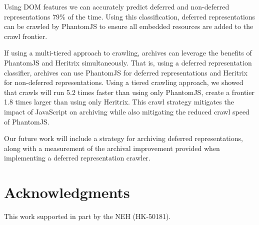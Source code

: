 \documentclass{sig-alternate}
\begin{document}
Using DOM features we can accurately predict deferred and non-deferred representations 79\% of the time. Using this classification, deferred representations can be crawled by PhantomJS to ensure all embedded resources are added to the crawl frontier.

If using a multi-tiered approach to crawling, archives can leverage the benefits of PhantomJS and Heritrix simultaneously. That is, using a deferred representation classifier, archives can use PhantomJS for deferred representations and Heritrix for non-deferred representations. Using a tiered crawling approach, we showed that crawls will run 5.2 times faster than using only PhantomJS, create a frontier 1.8 times larger than using only Heritrix. This crawl strategy mitigates the impact of JavaScript on archiving while also mitigating the reduced crawl speed of PhantomJS.

Our future work will include a strategy for archiving deferred representations, along with a measurement of the archival improvement provided when implementing a deferred representation crawler. 



\section{Acknowledgments}
This work supported in part by the NEH (HK-50181).



  
\end{document}
